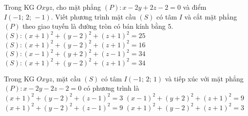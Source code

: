 \begin{ex}%
	Trong KG $Oxyz$, cho mặt phẳng $\left( P \right)\colon x-2y+2z-2=0$ và điểm $I\left( -1;\,2;\,-1 \right)$. Viết phương trình mặt cầu $\left( S \right)$ có tâm $I$ và cắt mặt phẳng $\left( P \right)$ theo giao tuyến là đường tròn có bán kính bằng $5$.
	\choice
	{$\left( S \right)\colon\left( x+1 \right)^2+\left( y-2 \right)^2+\left( z+1 \right)^2=25$}
	{$\left( S \right)\colon\left( x+1 \right)^2+\left( y-2 \right)^2+\left( z+1 \right)^2=16$}
	{$\left( S \right)\colon\left( x-1 \right)^2+\left( y+2 \right)^2+\left( z-1 \right)^2=34$}
	{\True $\left( S \right)\colon\left( x+1 \right)^2+\left( y-2 \right)^2+\left( z+1 \right)^2=34$}
\end{ex}

\begin{ex}%
	Trong KG $Oxyz$, mặt cầu $\left( S \right)$ có tâm $I\left( -1;\,2;\,1 \right)$ và tiếp xúc với mặt phẳng $\left( P \right)\colon x-2y-2z-2=0$ có phương trình là
	\choice
	{$\left( x+1 \right)^2+\left( y-2 \right)^2+\left( z-1 \right)^2=3$}
	{$\left( x-1 \right)^2+\left( y+2 \right)^2+\left( z+1 \right)^2=9$}
	{\True $\left( x+1 \right)^2+\left( y-2 \right)^2+\left( z-1 \right)^2=9$}
	{$\left( x+1 \right)^2+\left( y-2 \right)^2+\left( z+1 \right)^2=3$}
\end{ex}

